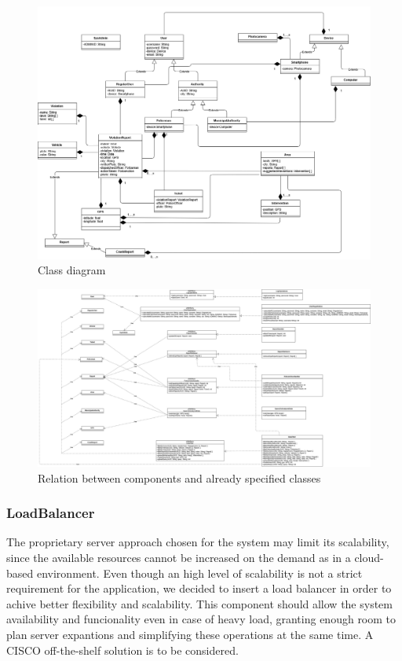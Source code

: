 \begin{figure}[H]
	\centering
	\includegraphics[angle=90, scale=0.35]{Images/ADV_class_diagram}
	\caption{Class diagram}
\end{figure}
\newpage

\begin{figure}[H]
	\centering
	\includegraphics[angle=90, scale=0.25]{Images/component_class_relation}
	\caption{Relation between components and already specified classes}
\end{figure}
\newpage

\subsubsection{LoadBalancer}
The proprietary server approach chosen for the system may limit its scalability, since the available resources cannot be increased on the demand as in a cloud-based environment. Even though an high level of scalability is not a strict requirement for the application, we decided to insert a load balancer in order to achive better flexibility and scalability. This component should allow the system availability and funcionality even in case of heavy load, granting enough room to plan server expantions and simplifying these operations at the same time. \newline
A CISCO off-the-shelf solution is to be considered.

